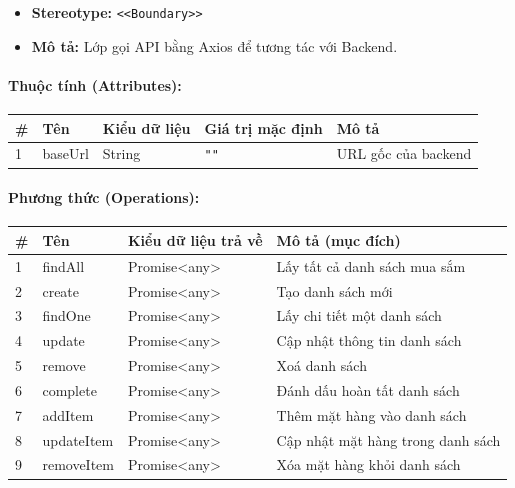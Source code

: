 \documentclass[12pt,a4paper]{article}
\begin{document}
\begin{itemize}[leftmargin=*]
    \item \textbf{Stereotype:} \texttt{\textless{}\textless{}Boundary\textgreater{}\textgreater{}}
    \item \textbf{Mô tả:} Lớp gọi API bằng Axios để tương tác với Backend.
\end{itemize}

\paragraph{Thuộc tính (Attributes):}
\begin{longtable}{|p{0.6cm}|p{3.5cm}|p{2.4cm}|p{1.8cm}|p{5.1cm}|}
\hline
\textbf{\#} & \textbf{Tên} & \textbf{Kiểu dữ liệu} & \textbf{Giá trị mặc định} & \textbf{Mô tả} \\ \hline
\endhead
1 & baseUrl & String & \texttt{""} & URL gốc của backend \\ \hline
\end{longtable}

\paragraph{Phương thức (Operations):}
\begin{longtable}{|p{0.6cm}|p{5.0cm}|p{2.8cm}|p{5.4cm}|}
\hline
\textbf{\#} & \textbf{Tên} & \textbf{Kiểu dữ liệu trả về} & \textbf{Mô tả (mục đích)} \\ \hline
\endhead
1 & findAll & Promise\textless{}any\textgreater{} & Lấy tất cả danh sách mua sắm \\ \hline
2 & create & Promise\textless{}any\textgreater{} & Tạo danh sách mới \\ \hline
3 & findOne & Promise\textless{}any\textgreater{} & Lấy chi tiết một danh sách \\ \hline
4 & update & Promise\textless{}any\textgreater{} & Cập nhật thông tin danh sách \\ \hline
5 & remove & Promise\textless{}any\textgreater{} & Xoá danh sách \\ \hline
6 & complete & Promise\textless{}any\textgreater{} & Đánh dấu hoàn tất danh sách \\ \hline
7 & addItem & Promise\textless{}any\textgreater{} & Thêm mặt hàng vào danh sách \\ \hline
8 & updateItem & Promise\textless{}any\textgreater{} & Cập nhật mặt hàng trong danh sách \\ \hline
9 & removeItem & Promise\textless{}any\textgreater{} & Xóa mặt hàng khỏi danh sách \\ \hline
\end{longtable}
\end{document}
